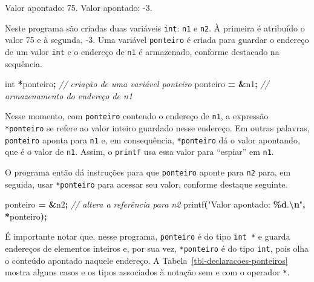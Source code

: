 \documentclass[
  11pt,
  a4paper,
]{scrbook}
\newenvironment{Shaded}{\begin{snugshade}}{\end{snugshade}}
\newcommand{\CommentTok}[1]{\textcolor[rgb]{0.56,0.35,0.01}{\textit{#1}}}
\newcommand{\DataTypeTok}[1]{\textcolor[rgb]{0.13,0.29,0.53}{#1}}
\newcommand{\NormalTok}[1]{#1}
\newcommand{\OperatorTok}[1]{\textcolor[rgb]{0.81,0.36,0.00}{\textbf{#1}}}
\newcommand{\SpecialCharTok}[1]{\textcolor[rgb]{0.81,0.36,0.00}{\textbf{#1}}}
\newcommand{\StringTok}[1]{\textcolor[rgb]{0.31,0.60,0.02}{#1}}
\begin{document}
\begin{Shaded}
\begin{Highlighting}[]
\NormalTok{Valor apontado: 75.}
\NormalTok{Valor apontado: {-}3.}
\end{Highlighting}
\end{Shaded}

Neste programa são criadas duas variáveis \texttt{int}: \texttt{n1} e
\texttt{n2}. À primeira é atribuído o valor 75 e à segunda, -3. Uma
variável \texttt{ponteiro} é criada para guardar o endereço de um valor
\texttt{int} e o endereço de \texttt{n1} é armazenado, conforme
destacado na sequência.

\begin{Shaded}
\begin{Highlighting}[]
\DataTypeTok{int} \OperatorTok{*}\NormalTok{ponteiro}\OperatorTok{;}  \CommentTok{// criação de uma variável ponteiro}
\NormalTok{ponteiro }\OperatorTok{=} \OperatorTok{\&}\NormalTok{n1}\OperatorTok{;}  \CommentTok{// armazenamento do endereço de n1}
\end{Highlighting}
\end{Shaded}

Nesse momento, com \texttt{ponteiro} contendo o endereço de \texttt{n1},
a expressão \texttt{*ponteiro} se refere ao valor inteiro guardado nesse
endereço. Em outras palavras, \texttt{ponteiro} aponta para \texttt{n1}
e, em consequência, \texttt{*ponteiro} dá o valor apontando, que é o
valor de \texttt{n1}. Assim, o \texttt{printf} usa essa valor para
``espiar'' em \texttt{n1}.

O programa então dá instruções para que \texttt{ponteiro} aponte para
\texttt{n2} para, em seguida, usar \texttt{*ponteiro} para acessar seu
valor, conforme destaque seguinte.

\begin{Shaded}
\begin{Highlighting}[]
\NormalTok{ponteiro }\OperatorTok{=} \OperatorTok{\&}\NormalTok{n2}\OperatorTok{;}  \CommentTok{// altera a referência para n2}
\NormalTok{printf}\OperatorTok{(}\StringTok{"Valor apontado: }\SpecialCharTok{\%d}\StringTok{.}\SpecialCharTok{\textbackslash{}n}\StringTok{"}\OperatorTok{,} \OperatorTok{*}\NormalTok{ponteiro}\OperatorTok{);}
\end{Highlighting}
\end{Shaded}

É importante notar que, nesse programa, \texttt{ponteiro} é do tipo
\texttt{int\ *} e guarda endereços de elementos inteiros e, por sua vez,
\texttt{*ponteiro} é do tipo \texttt{int}, pois olha o conteúdo apontado
naquele endereço. A Tabela~\ref{tbl-declaracoes-ponteiros} mostra alguns
casos e os tipos associados à notação sem e com o operador \texttt{*}.
\end{document}

